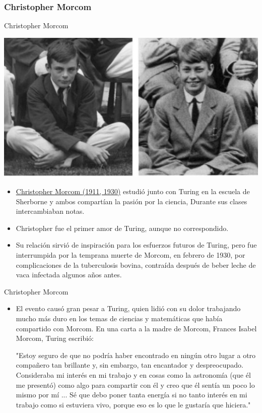 \documentclass{beamer}
\begin{document}
\subsubsection{Christopher Morcom}
\begin{frame}{Christopher Morcom}
    \begin{center}
        \includegraphics[scale=0.3]{Morcom.png}
    \end{center}
    \begin{itemize}
        \item \href{https://culturacientifica.com/2017/06/21/el-teorema-de-morcom/}{Christopher Morcom (1911, 1930)} estudió junto con Turing en la escuela de Sherborne y ambos compartían la pasión por la ciencia, Durante sus clases intercambiaban notas.\pause
        \item Christopher fue el primer amor de Turing, aunque no correspondido.\pause
        \item Su relación sirvió de inspiración para los esfuerzos futuros de Turing, pero fue interrumpida por la temprana muerte de Morcom, en febrero de 1930, por complicaciones de la tuberculosis bovina, contraída después de beber leche de vaca infectada algunos años antes.
\end{itemize}
\end{frame}
\begin{frame}{Christopher Morcom}\pause
    \begin{itemize}
        \item El evento causó gran pesar a Turing, quien lidió con su dolor trabajando mucho más duro en los temas de ciencias y matemáticas que había compartido con Morcom. En una carta a la madre de Morcom, Frances Isabel Morcom, Turing escribió:\pause\\
        \begin{center}
            "Estoy seguro de que no podría haber encontrado en ningún otro lugar a otro compañero tan brillante y, sin embargo, tan encantador y despreocupado. Consideraba mi interés en mi trabajo y en cosas como la astronomía (que él me presentó) como algo para compartir con él y creo que él sentía un poco lo mismo por mí ... Sé que debo poner tanta energía si no tanto interés en mi trabajo como si estuviera vivo, porque eso es lo que le gustaría que hiciera."
        \end{center}
    \end{itemize}
\end{frame}
\end{document}
